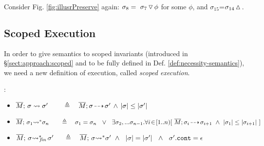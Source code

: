  \noindent Consider Fig. \ref{fig:illusrPreserve}  again: $\sigma_8 =  \ {\sigma_7} \, {\triangledown}\, {\phi} $ for some $\phi$, {and}  $\sigma_{15}$=$\sigma_{14} \, {\vartriangle}\,$.

 
 \subsection{Scoped Execution}
 \label{sect:bounded}


In order to give semantics to scoped invariants (introduced in \S  \ref{sect:approach:scoped} and to be fully defined  in Def.  \ref{def:necessity-semantics}), we need a new definition of execution, called \emph{scoped execution}. 

 
 \renewcommand{\EarlierS}[2]{\DepthSt{#1} \leq \DepthSt{#2}}
 \renewcommand{\NotEarlierS}[2]{\DepthSt{#1} \not\leq \DepthSt{#2}} 
 
\begin{definition}:
\label{def:shallow:term}
 
\begin{itemize}

  \item
{  $\leadstoBounded  {\Mtwo} {\sigma}   {\sigma'} \ \ \   \,   \ \ \ \triangleq \ \ \  \leadstoOrig {\Mtwo} {\sigma} {\sigma'} \, \wedge\, 
 \EarlierS {\sigma}  {\sigma'} $}
  \item
{  $\leadstoBoundedStar {\Mtwo}  {\sigma_1}  {\sigma_n}  \ \ \,  \ \    \ \triangleq  \ \ \  {\sigma_1} = {\sigma_n}\ \ \vee \ \  \exists \sigma_2,...\sigma_{n-1}.\forall i\!\in\! [1..n)[\  \leadstoOrig {\Mtwo}  {\sigma_i}  {\sigma_{i+1}}\  \wedge\  \EarlierS{\sigma_1} {\sigma_{i+1}} \ ]$ }
\item
  $\leadstoBoundedStarFin {\Mtwo}  {\sigma}  {\sigma'}  \  \,  \ \  \ \triangleq  \ \ \  \leadstoBoundedStar {\Mtwo}  {\sigma}  {\sigma'}  \ \wedge\ \
 {\DepthFs \sigma = \DepthFs {\sigma'} \ \ \wedge \ \ \sigma'.\prg{cont}=\epsilon  } $
 \end{itemize}
\end{definition}


